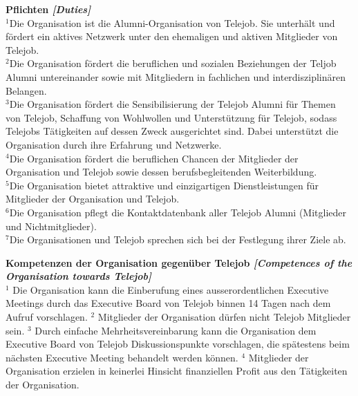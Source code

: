 \documentclass[10pt]{article}
\newcounter{qcounter}
\begin{document}
\begin{list}{{\bf Artikel :~}}{}
\item {\bf Pflichten {\it [Duties]}}\\
$^{1}$Die Organisation ist die Alumni-Organisation von Telejob. Sie unterh\"alt und f\"ordert ein aktives Netzwerk unter den ehemaligen und aktiven Mitglieder von Telejob.\\
$^{2}$Die Organisation f\"ordert die beruflichen und sozialen Beziehungen der Teljob Alumni untereinander sowie mit Mitgliedern in fachlichen und interdisziplin\"aren Belangen.\\
$^{3}$Die Organisation f\"ordert die Sensibilisierung der Telejob Alumni f\"ur Themen von Telejob, Schaffung von Wohlwollen und Unterst\"utzung f\"ur Telejob, sodass Telejobs T\"atigkeiten auf dessen Zweck ausgerichtet sind. Dabei unterst\"utzt die Organisation durch ihre Erfahrung und Netzwerke. \\
$^{4}$Die Organisation f\"ordert die beruflichen Chancen der Mitglieder der Organisation und Telejob sowie dessen berufsbegleitenden Weiterbildung.\\
$^{5}$Die Organisation bietet attraktive und einzigartigen Dienstleistungen f\"ur Mitglieder der Organisation und Telejob.\\
$^{6}$Die Organisation pflegt die Kontaktdatenbank aller Telejob Alumni (Mitglieder und Nichtmitglieder).\\
$^{7}$Die Organisationen und Telejob sprechen sich bei der Festlegung ihrer Ziele ab.\\

\item {\bf Kompetenzen der Organisation gegen\"uber Telejob {\it [Competences of the Organisation towards Telejob]}}\\
$^{1}$ Die Organisation kann die Einberufung eines ausserordentlichen Executive Meetings durch das Executive Board von Telejob binnen 14 Tagen nach dem Aufruf vorschlagen. 
$^{2}$ Mitglieder der Organisation d\"urfen nicht Telejob Mitglieder sein. 
$^{3}$ Durch einfache Mehrheitsvereinbarung kann die Organisation dem Executive Board von Telejob Diskussionspunkte vorschlagen, die sp\"atestens beim n\"achsten Executive Meeting behandelt werden k\"onnen.
$^{4}$ Mitglieder der Organisation erzielen in keinerlei Hinsicht finanziellen Profit aus den T\"atigkeiten der Organisation. 


\end{list}
\end{document}
